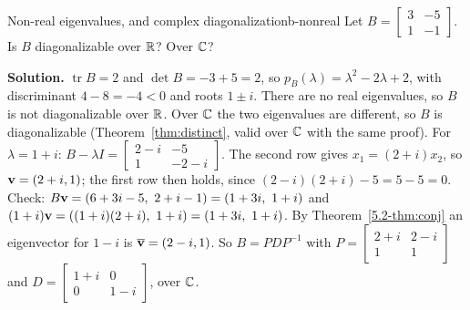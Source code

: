 \documentclass[11pt]{article}
\begin{document}
\begin{exmp}{Non-real eigenvalues, and complex diagonalization}{b-nonreal}
Let $B=\begin{bmatrix}3&-5\\1&-1\end{bmatrix}$. Is $B$ diagonalizable over $\mathbb{R}$? Over $\mathbb{C}$?

\textbf{Solution.} $\operatorname{tr}B=2$ and $\det B=-3+5=2$, so $p_B(\lambda)=\lambda^2-2\lambda+2$, with discriminant $4-8=-4<0$ and roots $1\pm i$. There are no real eigenvalues, so $B$ is not diagonalizable over $\mathbb{R}$. Over $\mathbb{C}$ the two eigenvalues are different, so $B$ is diagonalizable (Theorem~\ref{thm:distinct}, valid over $\mathbb{C}$ with the same proof). For $\lambda=1+i$: $B-\lambda I=\begin{bmatrix}2-i&-5\\1&-2-i\end{bmatrix}$. The second row gives $x_1=(2+i)x_2$, so $\mathbf{v}=(2+i,1)$; the first row then holds, since $(2-i)(2+i)-5=5-5=0$. Check: $B\bv{v}=(6+3i-5,\ 2+i-1)=(1+3i,\ 1+i)$ and $(1+i)\bv{v}=((1+i)(2+i),\ 1+i)=(1+3i,\ 1+i)$. By Theorem~\ref{5.2-thm:conj} an eigenvector for $1-i$ is $\overline{\mathbf{v}}=(2-i,1)$. So $B=PDP^{-1}$ with $P=\begin{bmatrix}2+i&2-i\\1&1\end{bmatrix}$ and $D=\begin{bmatrix}1+i&0\\0&1-i\end{bmatrix}$, over $\mathbb{C}$.
\end{exmp}
\end{document}
